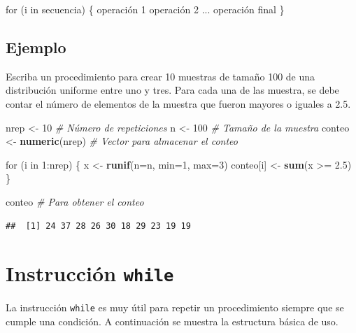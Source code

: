 \documentclass[10pt,]{krantz}
\makeatletter
\newenvironment{Shaded}{\begin{snugshade}}{\end{snugshade}}
\newcommand{\KeywordTok}[1]{\textcolor[rgb]{0.13,0.29,0.53}{\textbf{{#1}}}}
\newcommand{\DataTypeTok}[1]{\textcolor[rgb]{0.13,0.29,0.53}{{#1}}}
\newcommand{\DecValTok}[1]{\textcolor[rgb]{0.00,0.00,0.81}{{#1}}}
\newcommand{\FloatTok}[1]{\textcolor[rgb]{0.00,0.00,0.81}{{#1}}}
\newcommand{\StringTok}[1]{\textcolor[rgb]{0.31,0.60,0.02}{{#1}}}
\newcommand{\CommentTok}[1]{\textcolor[rgb]{0.56,0.35,0.01}{\textit{{#1}}}}
\newcommand{\NormalTok}[1]{{#1}}
\newenvironment{kframe}{%
\medskip{}
\setlength{\fboxsep}{.8em}
 \def\at@end@of@kframe{}%
 \ifinner\ifhmode%
  \def\at@end@of@kframe{\end{minipage}}%
  \begin{minipage}{\columnwidth}%
 \fi\fi%
 \def\FrameCommand##1{\hskip\@totalleftmargin \hskip-\fboxsep
 \colorbox{shadecolor}{##1}\hskip-\fboxsep
     \hskip-\linewidth \hskip-\@totalleftmargin \hskip\columnwidth}%
 \MakeFramed {\advance\hsize-\width
   \@totalleftmargin\z@ \linewidth\hsize
   \@setminipage}}%
 {\par\unskip\endMakeFramed%
 \at@end@of@kframe}
\renewenvironment{Shaded}{\begin{kframe}}{\end{kframe}}
\makeatother
\begin{document}
\begin{Shaded}
\begin{Highlighting}[]
\NormalTok{for (i in secuencia) \{}
  \NormalTok{operación }\DecValTok{1}
  \NormalTok{operación }\DecValTok{2}
  \NormalTok{...}
  \NormalTok{operación final}
\NormalTok{\}}
\end{Highlighting}
\end{Shaded}

\subsection*{Ejemplo}\label{ejemplo-17}


Escriba un procedimiento para crear 10 muestras de tamaño 100 de una
distribución uniforme entre uno y tres. Para cada una de las muestra, se
debe contar el número de elementos de la muestra que fueron mayores o
iguales a 2.5.

\begin{Shaded}
\begin{Highlighting}[]
\NormalTok{nrep <-}\StringTok{ }\DecValTok{10}  \CommentTok{# Número de repeticiones}
\NormalTok{n <-}\StringTok{ }\DecValTok{100}    \CommentTok{# Tamaño de la muestra}
\NormalTok{conteo <-}\StringTok{ }\KeywordTok{numeric}\NormalTok{(nrep)  }\CommentTok{# Vector para almacenar el conteo}

\NormalTok{for (i in }\DecValTok{1}\NormalTok{:nrep) \{}
  \NormalTok{x <-}\StringTok{ }\KeywordTok{runif}\NormalTok{(}\DataTypeTok{n=}\NormalTok{n, }\DataTypeTok{min=}\DecValTok{1}\NormalTok{, }\DataTypeTok{max=}\DecValTok{3}\NormalTok{)}
  \NormalTok{conteo[i] <-}\StringTok{ }\KeywordTok{sum}\NormalTok{(x >=}\StringTok{ }\FloatTok{2.5}\NormalTok{)}
\NormalTok{\}}

\NormalTok{conteo  }\CommentTok{# Para obtener el conteo}
\end{Highlighting}
\end{Shaded}

\begin{verbatim}
##  [1] 24 37 28 26 30 18 29 23 19 19
\end{verbatim}

\section{\texorpdfstring{Instrucción \texttt{while}
}{Instrucción while }}\label{instruccion-while}

La instrucción \texttt{while} es muy útil para repetir un procedimiento
siempre que se cumple una condición. A continuación se muestra la
estructura básica de uso.
\end{document}
